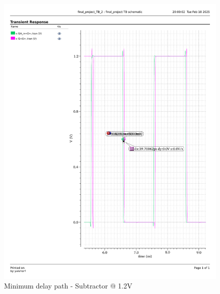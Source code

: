 \documentclass[a4paper,12pt]{article}
\begin{document}
\begin{figure}[H]
    \centering
    \begin{minipage}{0.49\textwidth}
        \centering
        \includegraphics[width=\textwidth]{delay/CP_min_sub_1.2.pdf}
        \caption{Minimum delay path - Subtractor @ 1.2V}
    \end{minipage}
    \hfill
    \begin{minipage}{0.49\textwidth}
        \centering

\end{minipage}
\end{figure}
\end{document}
